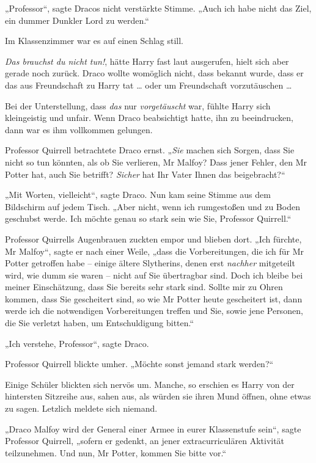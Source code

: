 {„Professor“, sagte Dracos nicht verstärkte Stimme. „Auch ich habe nicht das Ziel, ein dummer Dunkler Lord zu werden.“

Im Klassenzimmer war es auf einen Schlag still.

\emph{Das brauchst du nicht tun!}, hätte Harry fast laut ausgerufen, hielt sich aber gerade noch zurück. Draco wollte womöglich nicht, dass bekannt wurde, dass er das aus Freundschaft zu Harry tat … oder um Freundschaft vorzutäuschen …

Bei der Unterstellung, dass \emph{das} nur \emph{vorgetäuscht} war, fühlte Harry sich kleingeistig und unfair. Wenn Draco beabsichtigt hatte, ihn zu beeindrucken, dann war es ihm vollkommen gelungen.

Professor Quirrell betrachtete Draco ernst. „\emph{Sie} machen sich Sorgen, dass Sie nicht so tun könnten, als ob Sie verlieren, Mr Malfoy? Dass jener Fehler, den Mr Potter hat, auch Sie betrifft? \emph{Sicher} hat Ihr Vater Ihnen das beigebracht?“

„Mit Worten, vielleicht“, sagte Draco. Nun kam seine Stimme aus dem Bildschirm auf jedem Tisch. „Aber nicht, wenn ich rumgestoßen und zu Boden geschubst werde. Ich möchte genau so stark sein wie Sie, Professor Quirrell.“

Professor Quirrells Augenbrauen zuckten empor und blieben dort. „Ich fürchte, Mr Malfoy“, sagte er nach einer Weile, „dass die Vorbereitungen, die ich für Mr Potter getroffen habe -- einige ältere Slytherins, denen erst \emph{nachher} mitgeteilt wird, wie dumm sie waren -- nicht auf Sie übertragbar sind. Doch ich bleibe bei meiner Einschätzung, dass Sie bereits sehr stark sind. Sollte mir zu Ohren kommen, dass Sie gescheitert sind, so wie Mr Potter heute gescheitert ist, dann werde ich die notwendigen Vorbereitungen treffen und Sie, sowie jene Personen, die Sie verletzt haben, um Entschuldigung bitten.“

„Ich verstehe, Professor“, sagte Draco.

Professor Quirrell blickte umher. „Möchte sonst jemand stark werden?“

Einige Schüler blickten sich nervös um. Manche, so erschien es Harry von der hintersten Sitzreihe aus, sahen aus, als würden sie ihren Mund öffnen, ohne etwas zu sagen. Letzlich meldete sich niemand.

„Draco Malfoy wird der General einer Armee in eurer Klassenstufe sein“, sagte Professor Quirrell, „sofern er gedenkt, an jener extracurriculären Aktivität teilzunehmen. Und nun, Mr Potter, kommen Sie bitte vor.“

}
